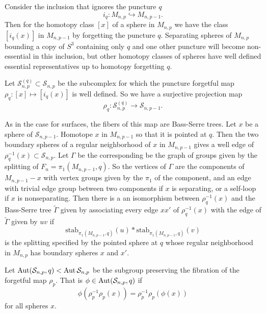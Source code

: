 \begin{remark}
  Consider the inclusion that ignores the puncture $q$
  $$i_q: M_{n,p} \hookrightarrow M_{n,p-1}.$$
  Then for the homotopy class $[x]$ of a sphere
  in $M_{n,p}$ we have the class $[i_q(x)]$ in $M_{n,p-1}$
  by forgetting the puncture $q$.
  Separating spheres of $M_{n,p}$ bounding a copy of $S^3$ containing only $q$ and one other puncture
  will become non-essential in this inclusion,
  but other homotopy classes of spheres have well defined
  essential representatives up to homotopy forgetting $q$.

  Let $\mathcal S_{n,p}^{(q)} \subset \mathcal S_{n,p}$
  be the subcomplex for which the puncture forgetful map
  $\rho_q: [x] \mapsto [i_q(x)]$ is well defined.
  So we have a surjective projection map
  $$
  \rho_q: \mathcal S_{n,p}^{(q)} \to \mathcal S_{n,p-1}.
  $$

As in the case for surfaces, the fibers of this map are Bass-Serre trees.
Let $x$ be a sphere of $\mathcal S_{n,p-1}$.
Homotope $x$ in $M_{n,p-1}$ so that it is pointed at $q$.
Then the two boundary  spheres of a regular neighborhood of $x$ in $M_{n,p-1}$ gives a well edge of $\rho^{-1}_q(x) \subset \mathcal S_{n,p}$.
Let $\Gamma$ be the corresponding
be the graph of groups given by the splitting of $F_n=\pi_1(M_{n,p-1},q)$.
So the vertices of $\Gamma$ are the components of
$M_{n,p-1}-x$ with vertex groups given by the $\pi_1$ of the component,
and an edge with trivial edge group between two components if $x$ is separating, or a self-loop if $x$ is nonseparating.
Then there is a an isomorphism between
$\rho_q^{-1}(x)$ and the Bass-Serre tree $\tilde \Gamma$
given by associating every edge $xx'$ of $\rho_q^{-1}(x)$
with the edge of $\tilde \Gamma$ given by $uv$
if
$$
\mbox{stab}_{\pi_1(M_{n,p-1},q)}(u)
\ast
\mbox{stab}_{\pi_1(M_{n,p-1},q)}(v)
$$
is the splitting specified
by the pointed sphere at $q$ whose regular neighborhood in $M_{n,p}$ has boundary spheres
$x$ and $x'$.
\end{remark}


\begin{definition}
  Let $\operatorname{Aut}(\mathcal S_{n,p},q) < \operatorname{Aut} \mathcal S_{n,p}$
  be the subgroup preserving the fibration of
  the forgetful map $\rho_p$.
  That is $\phi \in \operatorname{Aut}(\mathcal S_{n,p},q)$
  if
  $$
  \phi \left( \rho_p^{-1}\rho_p(x) \right)
  =
  \rho_p^{-1}\rho_p( \phi(x))
  $$
  for all spheres $x$.
\end{definition}

